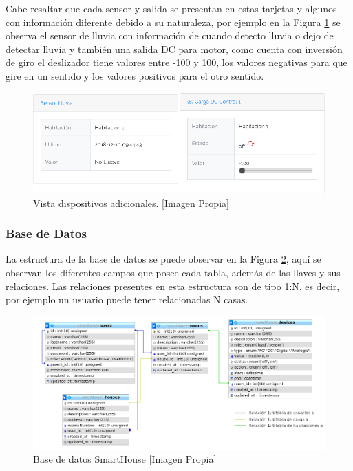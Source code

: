 Cabe resaltar que cada sensor y salida se presentan en estas tarjetas y algunos con información diferente debido a su naturaleza, por ejemplo en la Figura \ref{fig:r_app1} se observa el sensor de lluvia con información de cuando detecto lluvia o dejo de detectar lluvia y también una salida DC para motor, como cuenta con inversión de giro el deslizador tiene valores entre -100 y 100, los valores negativas para que gire en un sentido y los valores positivos para el otro sentido.

\begin{figure}[H]
	\centering
	\caption[Vista dispositivos adicionales.]{Vista dispositivos adicionales. [Imagen Propia]}
	\label{fig:r_app1}
	\includegraphics[width=\linewidth]{Imagenes/R_app1}
\end{figure}

\subsubsection{Base de Datos}

La estructura de la base de datos se puede observar en la Figura \ref{fig:db}, aquí se observan los diferentes campos que posee cada tabla, además de las llaves y sus relaciones. Las relaciones presentes en esta estructura son de tipo 1:N, es decir, por ejemplo un usuario puede tener relacionadas N casas.\\

\begin{figure}[H]
	\centering
	\caption{Base de datos SmartHouse [Imagen Propia]}
	\label{fig:db}
	\includegraphics[width=0.75\linewidth]{Imagenes/DB}
\end{figure}


